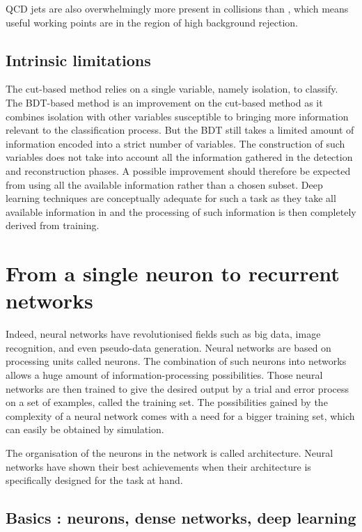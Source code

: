 QCD jets are also overwhelmingly more present in collisions than \tauh, which means useful working points are in the region of high background rejection. 

\subsection{Intrinsic limitations}

The cut-based method relies on a single variable, namely isolation, to classify. The BDT-based method is an improvement on the cut-based method as it combines isolation with other variables susceptible to bringing more information relevant to the classification process. But the BDT still takes a limited amount of information encoded into a strict number of variables. The construction of such variables does not take into account all the information gathered in the detection and reconstruction phases. A possible improvement should therefore be expected from using all the available information rather than a chosen subset. Deep learning techniques are conceptually adequate for such a task as they take all available information in and the processing of such information is then completely derived from training.


\section{From a single neuron to recurrent networks}
\label{sec:NN}
Indeed, neural networks have revolutionised fields such as big data, image recognition, and even pseudo-data generation.
Neural networks are based on processing units called neurons. The combination of such neurons into networks allows a huge amount of information-processing possibilities. Those neural networks are then trained to give the desired output by a trial and error process on a set of examples, called the training set. The possibilities gained by the complexity of a neural network comes with a need for a bigger training set, which can easily be obtained by simulation.

The organisation of the neurons in the network is called architecture. Neural networks have shown their best achievements when their architecture is specifically designed for the task at hand.

\subsection{Basics : neurons, dense networks, deep learning}

